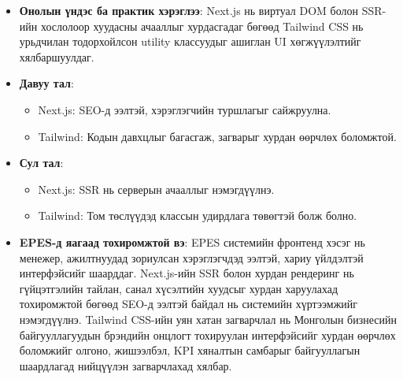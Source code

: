 \begin{itemize}
    \item \textbf{Онолын үндэс ба практик хэрэглээ}: Next.js нь виртуал DOM болон SSR-ийн хослолоор хуудасны ачааллыг хурдасгадаг бөгөөд Tailwind CSS нь 
    урьдчилан тодорхойлсон utility классуудыг ашиглан UI хөгжүүлэлтийг хялбаршуулдаг.
    \item \textbf{Давуу тал}:
    \begin{itemize}
        \item Next.js: SEO-д ээлтэй, хэрэглэгчийн туршлагыг сайжруулна.
        \item Tailwind: Кодын давхцлыг багасгаж, загварыг хурдан өөрчлөх боломжтой.
    \end{itemize}
    \item \textbf{Сул тал}:
    \begin{itemize}
        \item Next.js: SSR нь серверын ачааллыг нэмэгдүүлнэ.
        \item Tailwind: Том төслүүдэд классын удирдлага төвөгтэй болж болно.
    \end{itemize}
    \item \textbf{EPES-д яагаад тохиромжтой вэ}: EPES системийн фронтенд хэсэг нь менежер, ажилтнуудад зориулсан хэрэглэгчдэд ээлтэй, хариу үйлдэлтэй 
    интерфэйсийг шаарддаг. Next.js-ийн SSR болон хурдан рендеринг нь гүйцэтгэлийн тайлан, санал хүсэлтийн хуудсыг хурдан харуулахад тохиромжтой бөгөөд 
    SEO-д ээлтэй байдал нь системийн хүртээмжийг нэмэгдүүлнэ. Tailwind CSS-ийн уян хатан загварчлал нь Монголын бизнесийн байгууллагуудын брэндийн онцлогт 
    тохируулан интерфэйсийг хурдан өөрчлөх боломжийг олгоно, жишээлбэл, KPI хяналтын самбарыг байгууллагын шаардлагад нийцүүлэн загварчлахад хялбар.
\end{itemize}

